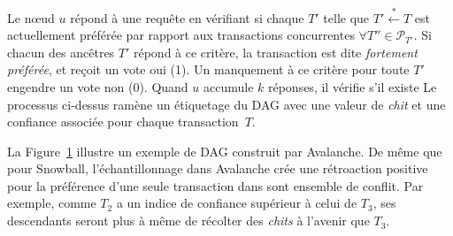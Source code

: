 Le nœud $u$ répond à une requête en vérifiant si chaque $T'$ telle que $T' \stackrel{*}{\gets} T$ est actuellement préférée par rapport aux transactions concurrentes $\forall T'' \in \mathcal{P}_{T'}$.
Si chacun des ancêtres $T'$ répond à ce critère, la transaction est dite \emph{fortement préférée}, et reçoit un vote oui (1). Un manquement à ce critère pour toute $T'$ engendre un vote non (0).
Quand $u$ accumule $k$ réponses, il vérifie s'il existe
Le processus ci-dessus ramène un étiquetage du DAG avec une valeur de \emph{chit} et une confiance associée pour chaque transaction~$T$.

\begin{figure}
\begin{center}
    
    \label{fig:dag-cd}
\end{center}
\end{figure}

La Figure~\ref{fig:dag-cd} illustre un exemple de DAG construit par Avalanche.
De même que pour Snowball, l'échantillonnage dans Avalanche crée une rétroaction positive pour la préférence d'une seule transaction dans sont ensemble de conflit.
Par exemple, comme $T_2$ a un indice de confiance supérieur à celui de $T_3$, ses descendants seront plus à même de récolter des \emph{chits} à l'avenir que $T_3$.

